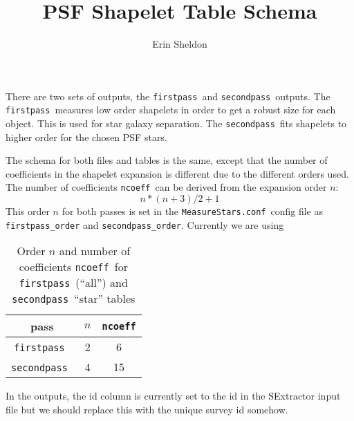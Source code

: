 \documentclass[12pt]{article}
\title{PSF Shapelet Table Schema}
\author{Erin Sheldon}
\newcommand{\orderfp}{2}
\newcommand{\ordersp}{4}
\newcommand{\ncoefffp}{6}
\newcommand{\ncoeffsp}{15}
\newcommand{\fpt}{\texttt{firstpass}}
\newcommand{\spt}{\texttt{secondpass}}
\newcommand{\ncoeff}{\texttt{ncoeff}}
\newcommand{\msconf}{\texttt{MeasureStars.conf}}
\begin{document}
\maketitle

There are two sets of outputs, the \fpt\ and \spt\ outputs.  The \fpt\
measures low order shapelets in order to get a robust size for each object.
This is used for star galaxy separation.  The \spt\ fits shapelets
to higher order for the chosen PSF stars.

The schema for both files and tables is the same, except that the number of
coefficients in the shapelet expansion is different due to the different orders
used.  The number of coefficients \ncoeff\ can be derived from the expansion
order $n$:
\begin{equation}
   n*(n+3)/2 + 1
\end{equation}
This order $n$ for both passes is set in the \msconf\ config file as
\texttt{firstpass\_order} and \texttt{secondpass\_order}.  Currently we are
using

\begin{table}[p]
    \begin{center}
    \small
    \begin{tabular}{ccc}
    pass & $n$ & \ncoeff \\
    \hline
    \fpt\ & \orderfp & \ncoefffp \\
    \spt\ & \ordersp & \ncoeffsp \\
    \hline
    \end{tabular}
    \end{center}

    \caption{Order $n$ and number of coefficients \ncoeff\ for \fpt\ (``all'')
    and \spt\ ``star'' tables}

    \normalsize
\end{table}

In the outputs, the id column is currently set to the id in the SExtractor
input file but we should replace this with the unique survey id somehow.
\end{document}
